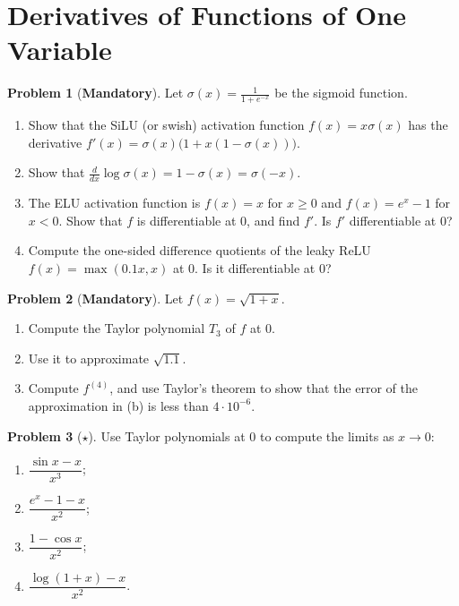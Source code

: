 \documentclass[11pt]{article}
\theoremstyle{definition}
\newtheorem{problem}{Problem}[section]
\newcommand{\mandatory}{\textcolor{red!70!black}{\textbf{Mandatory}}}
\begin{document}
\section{Derivatives of Functions of One Variable}

\begin{problem}[\mandatory]\label{pr:activation-derivs}
    Let $\sigma(x) = \frac{1}{1 + e^{-x}}$ be the sigmoid function.
    \begin{enumerate}[label=(\alph*)]
        \item Show that the SiLU (or swish) activation function $f(x) = x\sigma(x)$ has the derivative $f'(x) = \sigma(x)\big(1 + x(1 - \sigma(x))\big)$.
        \item Show that $\frac{d}{dx}\log\sigma(x) = 1 - \sigma(x) = \sigma(-x)$.
        \item The ELU activation function is $f(x) = x$ for $x \geq 0$ and $f(x) = e^x - 1$ for $x < 0$. Show that $f$ is differentiable at $0$, and find $f'$. Is $f'$ differentiable at $0$?
        \item Compute the one-sided difference quotients of the leaky ReLU $f(x) = \max(0.1x, x)$ at $0$. Is it differentiable at $0$?
    \end{enumerate}
\end{problem}

\begin{problem}[\mandatory]\label{pr:taylor-sqrt}
    Let $f(x) = \sqrt{1 + x}$.
    \begin{enumerate}[label=(\alph*)]
        \item Compute the Taylor polynomial $T_3$ of $f$ at $0$.
        \item Use it to approximate $\sqrt{1.1}$.
        \item Compute $f^{(4)}$, and use Taylor's theorem to show that the error of the approximation in (b) is less than $4 \cdot 10^{-6}$.
    \end{enumerate}
\end{problem}

\begin{problem}[$\star$]\label{pr:taylor-limits}
    Use Taylor polynomials at $0$ to compute the limits as $x \to 0$:
    \begin{enumerate}[label=(\alph*)]
        \item $\dfrac{\sin x - x}{x^3}$;
        \item $\dfrac{e^x - 1 - x}{x^2}$;
        \item $\dfrac{1 - \cos x}{x^2}$;
        \item $\dfrac{\log(1 + x) - x}{x^2}$.
    \end{enumerate}
\end{problem}
\end{document}
